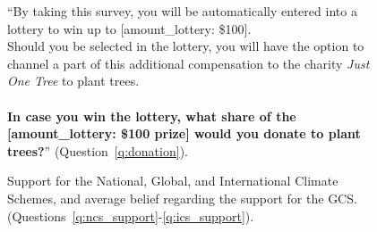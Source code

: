 \begin{figure}[h!]
    \caption[Amounts donated to plant trees.]{``By taking this survey, you will be automatically entered into a lottery to win up to [amount\_lottery: \$100]. \\Should you be selected in the lottery, you will have the option to channel a part of this additional compensation to the charity \textit{Just One Tree} to plant trees.\\\\\textbf{In case you win the lottery, what share of the [amount\_lottery: \$100 prize] would you donate to plant trees?}'' (Question~\ref{q:donation}).
    }\label{fig:donation}
\end{figure}


\begin{figure}[h!]
    \caption[Support for the NCS, GCS, ICS, and belief of support for GCS]{Support for the National, Global, and International Climate Schemes, and average belief regarding the support for the GCS. (Questions~\ref{q:ncs_support}-\ref{q:ics_support}).
    }\label{fig:ncs_gcs_ics}
\end{figure} 

